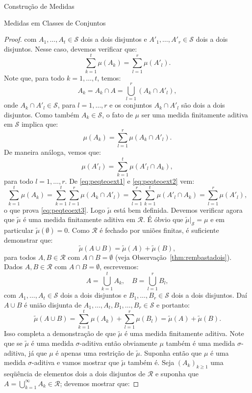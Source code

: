\documentclass[oneside,final,11pt]{amsbook}
\theoremstyle{remark}\newtheorem{exercise}{Exercício}[chapter]
\theoremstyle{remark}\newtheorem{*exercise}[exercise]{\hbox to 0pt{\hskip 0pt minus 1fil*}Exercício}
\theoremstyle{definition}\newtheorem{exdefin}{Definição}[chapter]
\theoremstyle{plain}\newtheorem{teo}{Teorema}[section]
\theoremstyle{plain}\newtheorem{lem}[teo]{Lema}
\theoremstyle{plain}\newtheorem{prop}[teo]{Proposição}
\theoremstyle{plain}\newtheorem{cor}[teo]{Corolário}
\theoremstyle{definition}\newtheorem{defin}[teo]{Definição}
\theoremstyle{remark}\newtheorem{rem}[teo]{Observação}
\theoremstyle{definition}\newtheorem{notation}[teo]{Notação}
\theoremstyle{definition}\newtheorem{convention}[teo]{Convenção}
\theoremstyle{definition}\newtheorem{example}[teo]{Exemplo}
\numberwithin{section}{chapter}
\numberwithin{equation}{section}
\begin{document}
\begin{chapter}{Construção de Medidas}
\begin{section}{Medidas em Classes de Conjuntos}
\begin{proof}
com $A_1,\ldots,A_t\in\mathcal S$ dois a dois disjuntos e $A'_1,\ldots,A'_r\in\mathcal S$ dois a dois
disjuntos. Nesse caso, devemos verificar que:
\begin{equation}\label{eq:peqteoext3}
\sum_{k=1}^t\mu(A_k)=\sum_{l=1}^r\mu(A'_l).
\end{equation}
Note que, para todo $k=1,\ldots,t$, temos:
\[A_k=A_k\cap A=\bigcup_{l=1}^r(A_k\cap A'_l),\]
onde $A_k\cap A'_l\in\mathcal S$, para $l=1,\ldots,r$ e os conjuntos $A_k\cap A'_l$ são dois a dois disjuntos.
Como também $A_k\in\mathcal S$, o fato de $\mu$ ser uma medida finitamente aditiva em $\mathcal S$ implica que:
\begin{equation}\label{eq:peqteoext1}
\mu(A_k)=\sum_{l=1}^r\mu(A_k\cap A'_l).
\end{equation}
De maneira análoga, vemos que:
\begin{equation}\label{eq:peqteoext2}
\mu(A'_l)=\sum_{k=1}^t\mu(A'_l\cap A_k),
\end{equation}
para todo $l=1,\ldots,r$. De \eqref{eq:peqteoext1} e \eqref{eq:peqteoext2} vem:
\[\sum_{k=1}^t\mu(A_k)=\sum_{k=1}^t\sum_{l=1}^r\mu(A_k\cap A'_l)=\sum_{l=1}^r\sum_{k=1}^t\mu(A'_l\cap A_k)
=\sum_{l=1}^r\mu(A'_l),\]
o que prova \eqref{eq:peqteoext3}. Logo $\tilde\mu$ está bem definida. Devemos verificar agora que $\tilde\mu$
é uma medida finitamente aditiva em $\mathcal R$. É óbvio que $\tilde\mu\vert_{\mathcal S}=\mu$ e em particular
$\tilde\mu(\emptyset)=0$. Como $\mathcal R$ é fechado por uniões finitas, é suficiente demonstrar que:
\[\tilde\mu(A\cup B)=\tilde\mu(A)+\tilde\mu(B),\]
para todos $A,B\in\mathcal R$ com $A\cap B=\emptyset$ (veja Observação~\ref{thm:rembastadois}).
Dados $A,B\in\mathcal R$ com $A\cap B=\emptyset$, escrevemos:
\[A=\bigcup_{k=1}^tA_k,\quad B=\bigcup_{l=1}^rB_l,\]
com $A_1,\ldots,A_t\in\mathcal S$ dois a dois disjuntos e $B_1,\ldots,B_r\in\mathcal S$ dois a dois disjuntos.
Daí $A\cup B$ é união disjunta de $A_1,\ldots,A_t,B_1,\ldots,B_r\in\mathcal S$ e portanto:
\[\tilde\mu(A\cup B)=\sum_{k=1}^t\mu(A_k)+\sum_{l=1}^r\mu(B_l)=\tilde\mu(A)+\tilde\mu(B).\]
Isso completa a demonstração de que $\tilde\mu$ é uma medida finitamente aditiva. Note que se $\tilde\mu$
é uma medida $\sigma$-aditiva então obviamente $\mu$ também é uma medida $\sigma$-aditiva, já que $\mu$ é
apenas uma restrição de $\tilde\mu$. Suponha então que $\mu$ é uma medida $\sigma$-aditiva e vamos mostrar
que $\tilde\mu$ também é. Seja $(A_k)_{k\ge1}$ uma seqüência de elementos dois a dois disjuntos de $\mathcal R$
e suponha que $A=\bigcup_{k=1}^\infty A_k\in\mathcal R$; devemos mostrar que:

\end{proof}
\end{section}
\end{chapter}
\end{document}

